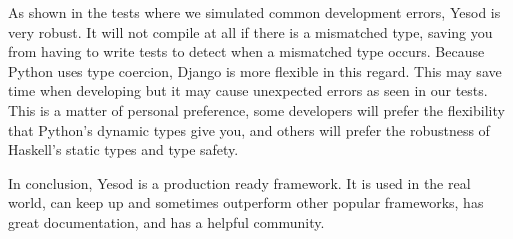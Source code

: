 As shown in the tests where we simulated common development errors, Yesod
is very robust. It will not compile at all if there is a mismatched type,
saving you from having to write tests to detect when a mismatched type
occurs. Because Python uses type coercion, Django is more flexible in
this regard. This may save time when developing but it may cause unexpected
errors as seen in our tests. This is a matter of personal preference, some
developers will prefer the flexibility that Python's dynamic types give
you, and others will prefer the robustness of Haskell's static types
and type safety.

In conclusion, Yesod is a production ready framework. It is used in the real
world, can keep up and sometimes outperform other popular frameworks,
has great documentation, and has a helpful community.
